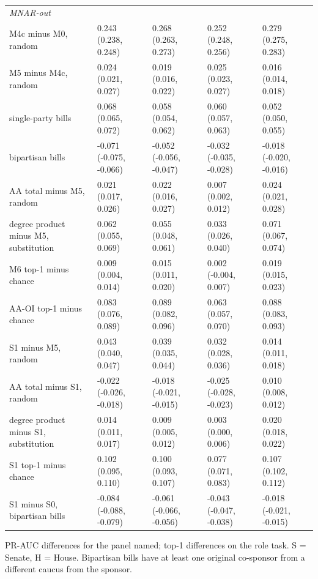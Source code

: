 \begin{table}[tbp]
{\begin{tabular}{lllll}
\multicolumn{5}{l}{\textit{MNAR-out}} \\
M4c minus M0, random & 0.243 (0.238, 0.248) & 0.268 (0.263, 0.273) & 0.252 (0.248, 0.256) & 0.279 (0.275, 0.283) \\
M5 minus M4c, random & 0.024 (0.021, 0.027) & 0.019 (0.016, 0.022) & 0.025 (0.023, 0.027) & 0.016 (0.014, 0.018) \\
\quad single-party bills & 0.068 (0.065, 0.072) & 0.058 (0.054, 0.062) & 0.060 (0.057, 0.063) & 0.052 (0.050, 0.055) \\
\quad bipartisan bills & -0.071 (-0.075, -0.066) & -0.052 (-0.056, -0.047) & -0.032 (-0.035, -0.028) & -0.018 (-0.020, -0.016) \\
AA total minus M5, random & 0.021 (0.017, 0.026) & 0.022 (0.016, 0.027) & 0.007 (0.002, 0.012) & 0.024 (0.021, 0.028) \\
degree product minus M5, substitution & 0.062 (0.055, 0.069) & 0.055 (0.048, 0.061) & 0.033 (0.026, 0.040) & 0.071 (0.067, 0.074) \\
M6 top-1 minus chance & 0.009 (0.004, 0.014) & 0.015 (0.011, 0.020) & 0.002 (-0.004, 0.007) & 0.019 (0.015, 0.023) \\
AA-OI top-1 minus chance & 0.083 (0.076, 0.089) & 0.089 (0.082, 0.096) & 0.063 (0.057, 0.070) & 0.088 (0.083, 0.093) \\
S1 minus M5, random & 0.043 (0.040, 0.047) & 0.039 (0.035, 0.044) & 0.032 (0.028, 0.036) & 0.014 (0.011, 0.018) \\
AA total minus S1, random & -0.022 (-0.026, -0.018) & -0.018 (-0.021, -0.015) & -0.025 (-0.028, -0.023) & 0.010 (0.008, 0.012) \\
degree product minus S1, substitution & 0.014 (0.011, 0.017) & 0.009 (0.005, 0.012) & 0.003 (0.000, 0.006) & 0.020 (0.018, 0.022) \\
S1 top-1 minus chance & 0.102 (0.095, 0.110) & 0.100 (0.093, 0.107) & 0.077 (0.071, 0.083) & 0.107 (0.102, 0.112) \\
S1 minus S0, bipartisan bills & -0.084 (-0.088, -0.079) & -0.061 (-0.066, -0.056) & -0.043 (-0.047, -0.038) & -0.018 (-0.021, -0.015) \\
\bottomrule
\end{tabular}
}
\par\vspace{2pt}\footnotesize PR-AUC differences for the panel named; top-1 differences on the role task. S = Senate, H = House. Bipartisan bills have at least one original co-sponsor from a different caucus from the sponsor.
\end{table}